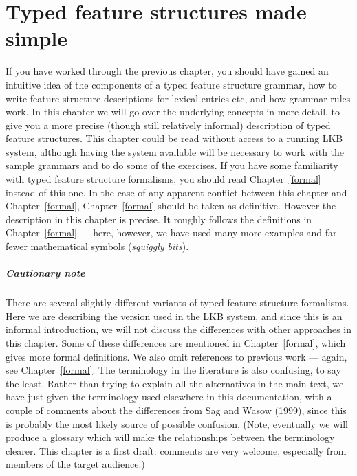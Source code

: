 \documentclass[12pt]{report}
\newcommand{\newterm}[1]{{\it #1}}
\begin{document}
\chapter{Typed feature structures made simple}
\label{easy}

If you have worked through the previous chapter, you should have
gained an intuitive idea of the components of a typed feature structure
grammar, how to write feature structure descriptions for lexical entries
etc, and how grammar rules work.  In this chapter we will go over the
underlying concepts in more detail, to give you a more precise (though 
still relatively informal)
description of typed feature structures.
This chapter could be read without access to a running
LKB system, although having the system available will be necessary to
work with the sample grammars and to do some of the exercises.  
If you have some familiarity
with typed feature structure formalisms, you should
read Chapter~\ref{formal} instead of this one.  In the case
of any apparent conflict between this chapter and Chapter~\ref{formal},
Chapter~\ref{formal} should be taken as definitive.  
However the description in this chapter is precise.  It roughly follows
the definitions in Chapter~\ref{formal} --- here, however,
we have used many more examples and far fewer mathematical symbols
(\newterm{squiggly bits}).

\paragraph{Cautionary note}  
There are several slightly different variants of
typed feature structure formalisms.  Here we are describing the 
version used in the LKB system, and since this is an informal
introduction, we will not discuss the differences with other approaches
in this chapter.  
Some of these differences are mentioned in Chapter~\ref{formal},
which gives more formal definitions.  We also omit references to
previous work --- again, see Chapter~\ref{formal}.
The terminology in the literature is also confusing, to say the least.  
Rather than trying to explain all the alternatives in the main
text, we have just given the terminology used elsewhere in this
documentation, with a couple of comments about the differences from
Sag and Wasow (1999), since this is probably the most likely
source of possible confusion.
(Note, eventually we will produce a glossary which will make the 
relationships between the terminology clearer.
This chapter is a first draft: comments are very welcome, especially
from members of the target audience.)
\end{document}
